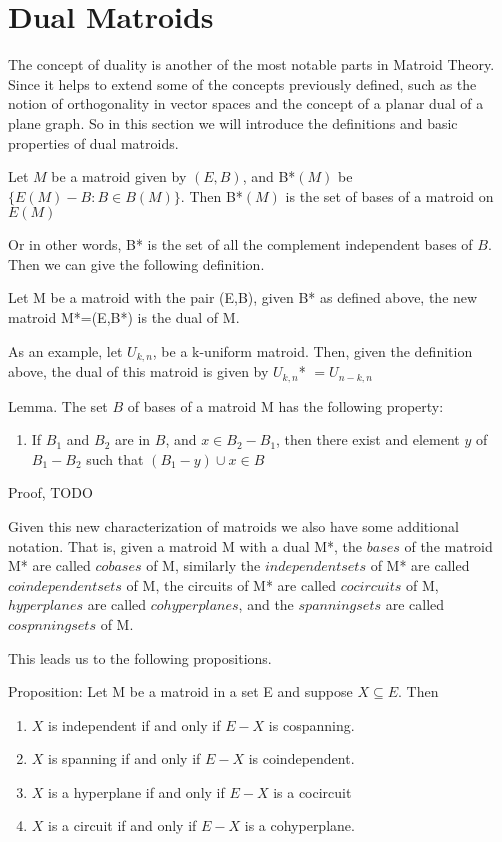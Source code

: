 \section{Dual Matroids}
The concept of duality is another of the most notable parts in Matroid Theory. Since it helps to extend some of the concepts previously defined, such as the notion of orthogonality in vector spaces and the concept of a planar dual of a plane graph. So in this section we will introduce the definitions and basic properties of dual matroids.

\begin{theorem}
    Let $M$ be a matroid given by $(E,B)$, and B*$(M)$ be $\{E(M) - B:B\in B(M)\}$. Then B*$(M)$ is the set of bases of a matroid on $E(M)$
\end{theorem}

Or in other words, B* is the set of all the complement independent bases of $B$. Then we can give the following definition.

\begin{defn}
    Let M be a matroid with the pair (E,B), given B* as defined above, the new matroid M*=(E,B*) is the dual of M.
\end{defn}

As an example, let $U_{k,n}$, be a k-uniform matroid. Then, given the definition above, the dual of this matroid is given by $U_{k,n}$* $= U_{n-k,n}$

Lemma. The set $B$ of bases of a matroid M has the following property:
\begin{enumerate}
    \item If $B_1$ and $B_2$ are in $B$, and $x\in B_2 - B_1$, then there exist and element $y$ of $B_1 - B_2$ such that $(B_1 - y) \cup x \in B$ 
\end{enumerate}

Proof, TODO


Given this new characterization of matroids we also have some additional notation. That is, given a matroid M with a dual M*, the $bases$ of the matroid M* are called $cobases$ of M, similarly the $independent sets$ of M* are called $coindependent sets$ of M, the circuits of M* are called $cocircuits$ of M, $hyperplanes$ are called $cohyperplanes$, and the $spanning sets$ are called $cospnning sets$ of M.

This leads us to the following propositions.

Proposition:
Let M be a matroid in a set E and suppose $X \subseteq E$. Then

    \begin{enumerate}
        \item $X$ is independent if and only if $E-X$ is cospanning.

        \item $X$ is spanning if and only if $E-X$ is coindependent.

        \item $X$ is a hyperplane if and only if $E-X$ is a cocircuit

        \item $X$ is a circuit if and only if $E-X$ is a cohyperplane.
    \end{enumerate}



